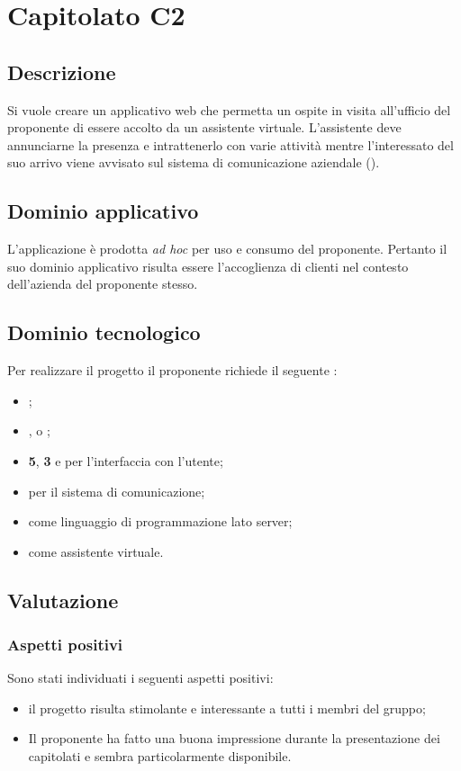 \documentclass[../StudioDiFattibilita.tex]{subfiles}
\begin{document}
	\section{Capitolato C2}
		\subsection{Descrizione}
		Si vuole creare un applicativo web che permetta un ospite in visita all'ufficio del proponente di essere accolto da un assistente virtuale. L'assistente deve annunciarne la presenza e intrattenerlo con varie attività mentre l'interessato del suo arrivo viene avvisato sul sistema di comunicazione aziendale ().
		\subsection{Dominio applicativo}
			L'applicazione è prodotta \textit{ad hoc} per uso e consumo del proponente. Pertanto il suo dominio applicativo risulta essere l'accoglienza di clienti nel contesto dell'azienda del proponente stesso.
		\subsection{Dominio tecnologico}
			Per realizzare il progetto il proponente richiede il seguente :
		\begin{itemize}
			\item \textbf{}; 
			\item \textbf{}, \textbf{} o \textbf{};
			\item \textbf{5}, \textbf{3} e \textbf{} per l'interfaccia con l'utente;
			\item \textbf{} per il sistema di comunicazione;
			\item \textbf{} \textbf{} come linguaggio di programmazione lato server;
			\item \textbf{} \textbf{} come assistente virtuale.
		\end{itemize}
		\subsection{Valutazione}
			\subsubsection{Aspetti positivi}
			Sono stati individuati i seguenti aspetti positivi:
			\begin{itemize}
				\item il progetto risulta stimolante e interessante a tutti i membri del gruppo;
				\item Il proponente ha fatto una buona impressione durante la presentazione dei capitolati e sembra particolarmente disponibile.
			\end{itemize}
\end{document}
